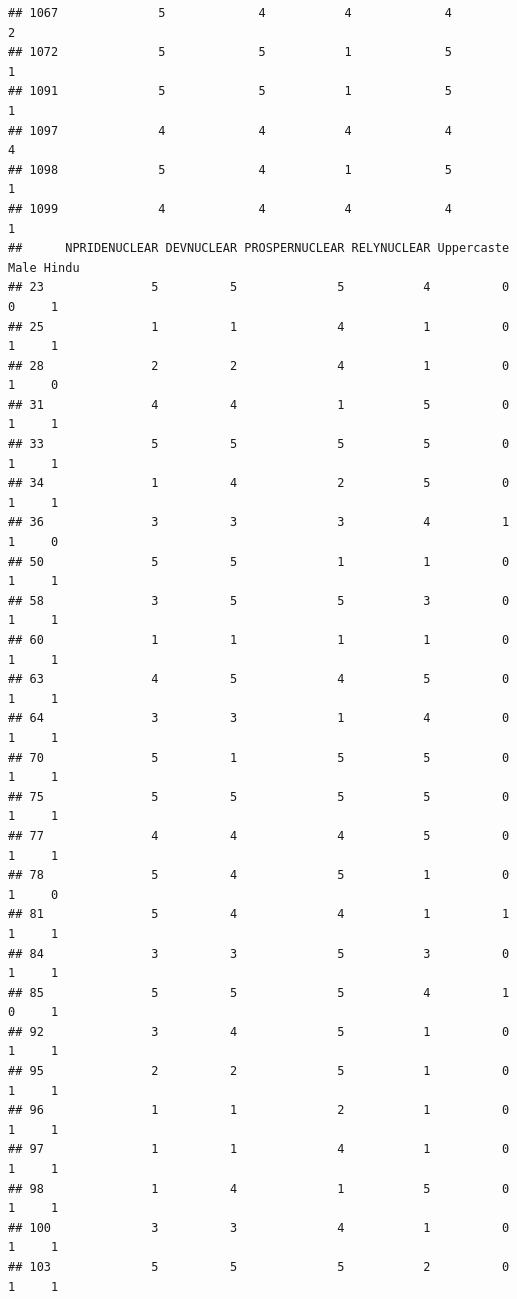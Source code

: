 \documentclass[
]{article}
\begin{document}
\begin{verbatim}
## 1067              5             4           4             4            2
## 1072              5             5           1             5            1
## 1091              5             5           1             5            1
## 1097              4             4           4             4            4
## 1098              5             4           1             5            1
## 1099              4             4           4             4            1
##      NPRIDENUCLEAR DEVNUCLEAR PROSPERNUCLEAR RELYNUCLEAR Uppercaste Male Hindu
## 23               5          5              5           4          0    0     1
## 25               1          1              4           1          0    1     1
## 28               2          2              4           1          0    1     0
## 31               4          4              1           5          0    1     1
## 33               5          5              5           5          0    1     1
## 34               1          4              2           5          0    1     1
## 36               3          3              3           4          1    1     0
## 50               5          5              1           1          0    1     1
## 58               3          5              5           3          0    1     1
## 60               1          1              1           1          0    1     1
## 63               4          5              4           5          0    1     1
## 64               3          3              1           4          0    1     1
## 70               5          1              5           5          0    1     1
## 75               5          5              5           5          0    1     1
## 77               4          4              4           5          0    1     1
## 78               5          4              5           1          0    1     0
## 81               5          4              4           1          1    1     1
## 84               3          3              5           3          0    1     1
## 85               5          5              5           4          1    0     1
## 92               3          4              5           1          0    1     1
## 95               2          2              5           1          0    1     1
## 96               1          1              2           1          0    1     1
## 97               1          1              4           1          0    1     1
## 98               1          4              1           5          0    1     1
## 100              3          3              4           1          0    1     1
## 103              5          5              5           2          0    1     1

\end{verbatim}
\end{document}
